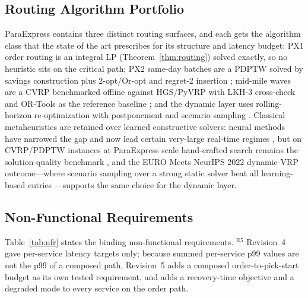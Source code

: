 \subsection{Routing Algorithm Portfolio}
ParaExpress contains three distinct routing surfaces, and each gets the algorithm class that the state of the art prescribes for its structure and latency budget: PX1 order routing is an integral LP (Theorem~\ref{thm:routing}) solved exactly, so no heuristic sits on the critical path; PX2 same-day batches are a PDPTW solved by savings construction plus 2-opt/Or-opt and regret-2 insertion \cite{clarke1964,ropke2006}; mid-mile waves are a CVRP benchmarked offline against HGS/PyVRP \cite{vidal2022,wouda2024} with LKH-3 cross-check \cite{helsgaun2017} and OR-Tools as the reference baseline \cite{ortools2025}; and the dynamic layer uses rolling-horizon re-optimization with postponement and scenario sampling \cite{klapp2018,ulmer2021,lan2024}. Classical metaheuristics are retained over learned constructive solvers: neural methods have narrowed the gap and now lead certain very-large real-time regimes \cite{kool2019,kwon2020,luo2023,ye2024}, but on CVRP/PDPTW instances at ParaExpress scale hand-crafted search remains the solution-quality benchmark \cite{vidal2022,voigt2025,christiaens2020}, and the EURO Meets NeurIPS 2022 dynamic-VRP outcome---where scenario sampling over a strong static solver beat all learning-based entries \cite{lan2024}---supports the same choice for the dynamic layer.

\subsection{Non-Functional Requirements}
Table~\ref{tab:nfr} states the binding non-functional requirements. $^{\mathrm{R5}}$ Revision~4 gave per-service latency targets only; because summed per-service p99 values are not the p99 of a composed path, Revision~5 adds a composed order-to-pick-start budget as its own tested requirement, and adds a recovery-time objective and a degraded mode to every service on the order path.

